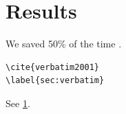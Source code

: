 \documentclass{article}
\begin{document}
\section{Results}
\label{sec:results}
We saved 50\% of the time \cite{real2020}.
\begin{verbatim}
\cite{verbatim2001}
\label{sec:verbatim}
\end{verbatim}
See \ref{sec:results}.
\end{document}
